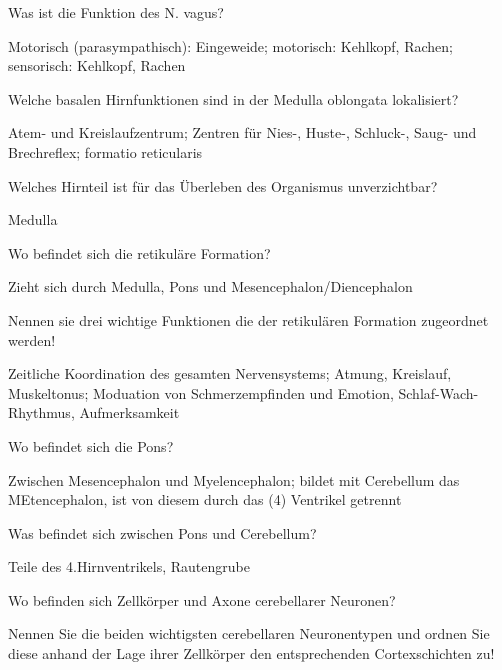 \documentclass[10pt, a4paper]{exam}
\begin{document}
\begin{questions}
  \question Was ist die Funktion des N. vagus?
  \begin{solution}
    Motorisch (parasympathisch): Eingeweide; motorisch: Kehlkopf, Rachen; sensorisch: Kehlkopf, Rachen
  \end{solution}

  \question Welche basalen Hirnfunktionen sind in der Medulla oblongata lokalisiert?
  \begin{solution}
    Atem- und Kreislaufzentrum; Zentren für Nies-, Huste-, Schluck-, Saug- und Brechreflex; formatio reticularis
  \end{solution}

  \question Welches Hirnteil ist für das Überleben des Organismus unverzichtbar?
  \begin{solution}
    Medulla
  \end{solution}

  \question Wo befindet sich die retikuläre Formation?
  \begin{solution}
    Zieht sich durch Medulla, Pons und Mesencephalon/Diencephalon
  \end{solution}

  \question Nennen sie drei wichtige Funktionen die der retikulären Formation zugeordnet werden!
  \begin{solution}
    Zeitliche Koordination des gesamten Nervensystems; Atmung, Kreislauf, Muskeltonus; Moduation von Schmerzempfinden und Emotion, Schlaf-Wach-Rhythmus, Aufmerksamkeit
  \end{solution}

  \question Wo befindet sich die Pons?
  \begin{solution}
    Zwischen Mesencephalon und Myelencephalon; bildet mit Cerebellum das MEtencephalon, ist von diesem durch das (4) Ventrikel getrennt
  \end{solution}

  \question Was befindet sich zwischen Pons und Cerebellum?
  \begin{solution}
    Teile des 4.Hirnventrikels, Rautengrube
  \end{solution}

  \question Wo befinden sich Zellkörper und Axone cerebellarer Neuronen?
  \begin{solution}

  \end{solution}

  \question Nennen Sie die beiden wichtigsten cerebellaren Neuronentypen und ordnen Sie diese anhand der Lage ihrer Zellkörper den entsprechenden Cortexschichten zu!
  \begin{solution}


\end{solution}
\end{questions}
\end{document}
